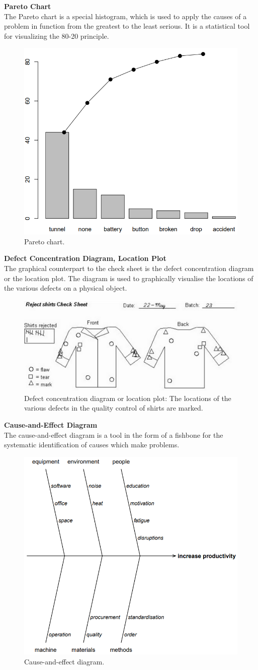 \textbf{Pareto Chart}\\
The Pareto chart is a special histogram, which is used to apply the causes of a problem in function from the greatest to the least serious. It is a statistical tool for visualizing the 80-20 principle.
\begin{figure}[H]
  \centering
  \includegraphics[width = 0.4\linewidth]{Pics/1.2.2.png}
  \caption{Pareto chart.}
\end{figure}

\textbf{Defect Concentration Diagram, Location Plot}\\
The graphical counterpart to the check sheet is the defect concentration diagram or the location plot. The diagram is used to graphically visualise the locations of the various defects on a physical object.
\begin{figure}[H]
  \centering
  \includegraphics[width = 0.6\linewidth]{Pics/1.2.3.png}
  \caption{Defect concentration diagram or location plot: The locations of the various defects in the quality control of shirts are marked.}
\end{figure}

\textbf{Cause-and-Effect Diagram}\\
The cause-and-effect diagram is a tool in the form of a fishbone for the systematic identification of causes which make problems.
\begin{figure}[H]
  \centering
  \includegraphics[width = 0.4\linewidth]{Pics/1.2.4.png}
  \caption{Cause-and-effect diagram.}
\end{figure}
